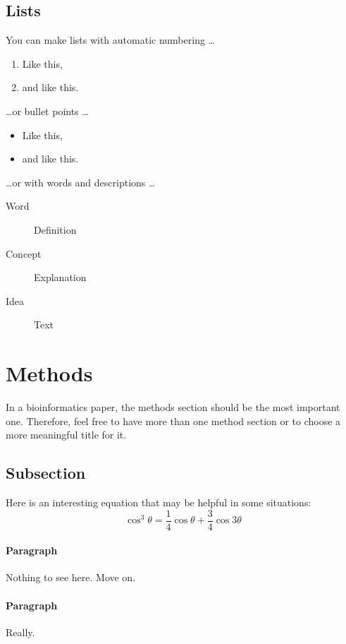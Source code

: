 \documentclass[fleqn,10pt,twoside]{gcb15submission}
\begin{document}
\subsection*{Lists}

You can make lists with automatic numbering \dots

\begin{enumerate}[noitemsep] 
\item Like this,
\item and like this.
\end{enumerate}
\dots or bullet points \dots
\begin{itemize}[noitemsep] 
\item Like this,
\item and like this.
\end{itemize}
\dots or with words and descriptions \dots
\begin{description}
\item[Word] Definition
\item[Concept] Explanation
\item[Idea] Text
\end{description}



\section*{Methods}

In a bioinformatics paper, the methods section should be the most important one.
Therefore, feel free to have more than one method section or to choose a more meaningful title for it.

\subsection*{Subsection}

Here is an interesting equation that may be helpful in some situations:
\begin{equation}
\cos^3 \theta =\frac{1}{4}\cos\theta+\frac{3}{4}\cos 3\theta
\label{eq:refname2}
\end{equation}

\paragraph{Paragraph}
Nothing to see here. Move on.

\paragraph{Paragraph}
Really.
\end{document}
